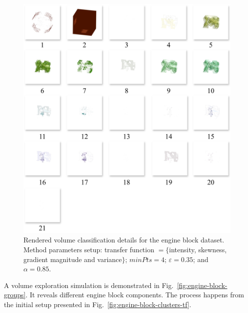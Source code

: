 \begin{figure}[htb!]
    \centering
    \includegraphics[width=\columnwidth]{figs/engine-block-clusters.jpg}
    \caption{Rendered volume classification details for the engine block dataset. Method parameters setup: transfer function  $=\{$intensity, skewness, gradient magnitude and variance$\}$; $minPts = 4$; $\varepsilon = 0.35$; and $\alpha = 0.85$.}
    \label{fig:engine-block-clusters}
\end{figure}

A volume exploration simulation is demonstrated in Fig.~\ref{fig:engine-block-groups}. It reveals different engine block components. The process happens from the initial setup presented in Fig.~\ref{fig:engine-block-clusters-tf}. 

